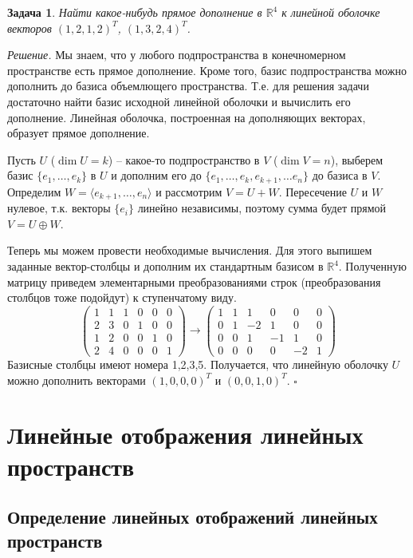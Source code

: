 \documentclass[a4paper,12pt]{article}
\newtheorem*{prob}{Задача}
\newenvironment{soln}{\noindent\textit{Решение.}}{\hfill$\square$}
\begin{document}
\begin{prob}
	Найти какое-нибудь прямое дополнение в $\mathbb{R}^4$ к линейной оболочке векторов $(1,2,1,2)^T$, $(1,3,2,4)^T$.
\end{prob}
\begin{soln}
	Мы знаем, что у любого подпространства в конечномерном пространстве есть прямое дополнение.
	Кроме того, базис подпространства можно дополнить до базиса объемлющего пространства. Т.е. для решения задачи достаточно найти базис исходной линейной оболочки и вычислить его дополнение. Линейная оболочка, построенная на дополняющих векторах, образует прямое дополнение.
			
	Пусть $U$ ($\dim U = k$) -- какое-то подпространство в $V$ ($\dim V = n$), выберем базис $\{e_1, \ldots, e_k \}$ в $U$ и дополним его до $\{e_1, \ldots, e_k, e_{k+1}, \ldots e_n\}$ до базиса в $V$. Определим $W = \langle e_{k+1}, \ldots, e_n \rangle$ и рассмотрим $V = U + W$. Пересечение $U$ и $W$ нулевое, т.к. векторы $\{e_i\}$ линейно независимы, поэтому сумма будет прямой $V = U \oplus W$.
	 
	Теперь мы можем провести необходимые вычисления. Для этого выпишем заданные вектор-столбцы и дополним их стандартным базисом в $\mathbb{R}^4$. Полученную матрицу приведем элементарными преобразованиями строк (преобразования столбцов тоже подойдут) к ступенчатому виду.
	\[
		\begin{pmatrix}
			1 & 1 & 1 & 0 & 0 & 0 \\
			2 & 3 & 0 & 1 & 0 & 0 \\
			1 & 2 & 0 & 0 & 1 & 0 \\
			2 & 4 & 0 & 0 & 0 & 1
  		\end{pmatrix}
		\to 
		\begin{pmatrix}
			1 & 1 & 1 & 0 & 0 & 0 \\
			0 & 1 &-2 & 1 & 0 & 0 \\
			0 & 0 & 1 &-1 & 1 & 0 \\
			0 & 0 & 0 & 0 &-2 & 1
		\end{pmatrix}	
	\]
	Базисные столбцы имеют номера 1,2,3,5. Получается, что линейную оболочку $U$ можно дополнить векторами $(1,0,0,0)^T$ и $(0,0,1,0)^T$.
\end{soln}

\section{Линейные отображения линейных пространств}

\subsection{Определение линейных отображений линейных пространств}
\end{document}
